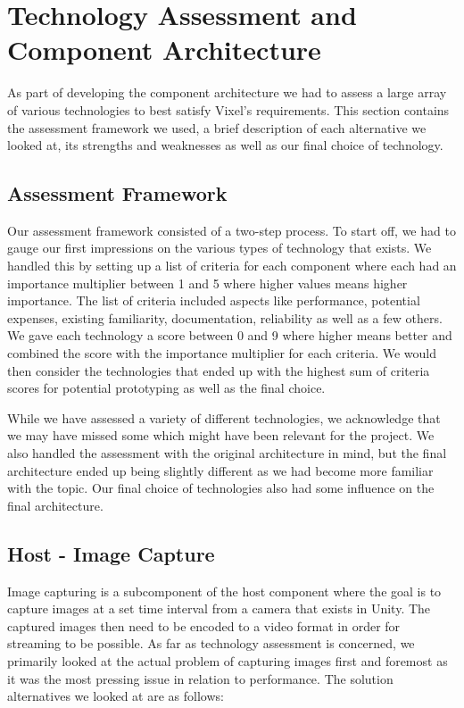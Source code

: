 \section{Technology Assessment and Component Architecture}
As part of developing the component architecture we had to assess a large array of various technologies to best satisfy Vixel's requirements. This section contains the assessment framework we used, a brief description of each alternative we looked at, its strengths and weaknesses as well as our final choice of technology.  

\subsection{Assessment Framework}
Our assessment framework consisted of a two-step process. To start off, we had to gauge our first impressions on the various types of technology that exists. We handled this by setting up a list of criteria for each component where each had an importance multiplier between 1 and 5 where higher values means higher importance. The list of criteria included aspects like performance, potential expenses, existing familiarity, documentation, reliability as well as a few others. We gave each technology a score between 0 and 9 where higher means better and combined the score with the importance multiplier for each criteria. We would then consider the technologies that ended up with the highest sum of criteria scores for potential prototyping as well as the final choice. 

While we have assessed a variety of different technologies, we acknowledge that we may have missed some which might have been relevant for the project. We also handled the assessment with the original architecture in mind, but the final architecture ended up being slightly different as we had become more familiar with the topic. Our final choice of technologies also had some influence on the final architecture. 

\subsection{Host - Image Capture} %
Image capturing is a subcomponent of the host component where the goal is to capture images at a set time interval from a camera that exists in Unity. The captured images then need to be encoded to a video format in order for streaming to be possible. As far as technology assessment is concerned, we primarily looked at the actual problem of capturing images first and foremost as it was the most pressing issue in relation to performance. The solution alternatives we looked at are as follows:

